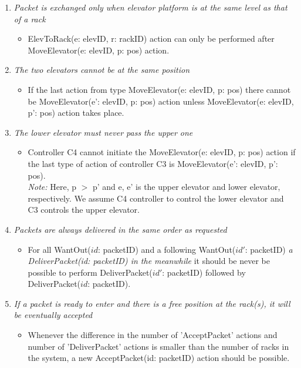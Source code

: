\begin{enumerate}
\item \textit{Packet is exchanged only when elevator platform is at the same level as that of a rack}
	\begin{itemize}
	\item ElevToRack(e: elevID, r: rackID) action can only be performed after
	MoveElevator(e: elevID, p: pos) action.
	\end{itemize}
	
\item \textit{The two elevators cannot be at the same position}
	\begin{itemize}
	\item If the last action from type MoveElevator(e: elevID, p: pos)
	there cannot be MoveElevator(e': elevID, p: pos) action unless 
	MoveElevator(e: elevID, p': pos) action takes place.
	

	\end{itemize}
		
\item \textit{The lower elevator must never pass the upper one}
	\begin{itemize}
	\item Controller C4 cannot initiate the MoveElevator(e: elevID, p: pos) 
	action if the last type of action of controller C3 is MoveElevator(e': elevID, p': pos).\\
	\textit{Note:} Here, p $>$ p' and e, e' is the upper elevator and 
	lower elevator, respectively. We assume C4 controller to control
	the lower elevator and C3 controls the upper elevator.
	\end{itemize}
	
\item \textit{Packets are always delivered in the same order as
	requested}	
	\begin{itemize}
	\item 
	For all WantOut($id$: packetID) and a following WantOut($id'$: 
	packetID) \textit{a DeliverPacket(id: packetID) in the meanwhile} it
	should be never be possible to perform DeliverPacket($id'$: 
	packetID) followed by DeliverPacket($id$: packetID).
	\end{itemize}
	
\item \textit{If a packet is ready to enter and there is a free
	position at the rack(s), it will be eventually accepted}
	\begin{itemize}
	\item Whenever the difference in the number of 'AcceptPacket'
	actions and number of 'DeliverPacket' actions is  smaller than the
	number of racks in the system, a new AcceptPacket(id: packetID)
	action should be possible.
	\end{itemize}
	

\end{enumerate}
